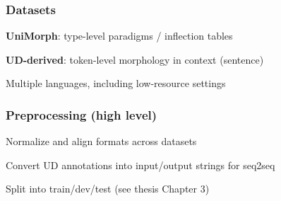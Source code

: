 
\begin{frame}
    \frametitle{Datasets}
    \begin{PraesentationAufzaehlung}
        \item \textbf{UniMorph}: type-level paradigms / inflection tables
        \item \textbf{UD-derived}: token-level morphology in context (sentence)
        \item Multiple languages, including low-resource settings
    \end{PraesentationAufzaehlung}
\end{frame}

\begin{frame}
    \frametitle{Preprocessing (high level)}
    \begin{PraesentationAufzaehlung}
        \item Normalize and align formats across datasets
        \item Convert UD annotations into input/output strings for seq2seq
        \item Split into train/dev/test (see thesis Chapter 3)
    \end{PraesentationAufzaehlung}
\end{frame}
